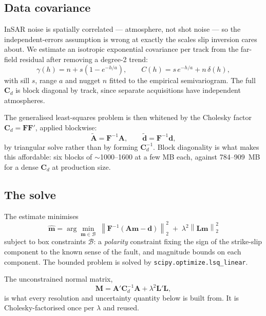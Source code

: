 \documentclass[11pt,a4paper]{article}
\newcommand{\A}{\mathbf{A}}
\newcommand{\Cd}{\mathbf{C}_d}
\newcommand{\Lop}{\mathbf{L}}
\newcommand{\M}{\mathbf{M}}
\newcommand{\bfm}{\bm{m}}
\newcommand{\bfd}{\bm{d}}
\begin{document}
\subsection{Data covariance}

InSAR noise is spatially correlated --- atmosphere, not shot noise --- so the
independent-errors assumption is wrong at exactly the scales slip inversion cares
about. We estimate an isotropic exponential covariance per track from the
far-field residual after removing a degree-2 trend:
\begin{equation}
\gamma(h) = n + s\left(1 - e^{-h/a}\right),
\qquad
C(h) = s\,e^{-h/a} + n\,\delta(h),
\label{eq:variogram}
\end{equation}
with sill $s$, range $a$ and nugget $n$ fitted to the empirical semivariogram.
The full $\Cd$ is block diagonal by track, since separate acquisitions have
independent atmospheres.

The generalised least-squares problem is then whitened by the Cholesky factor
$\Cd = \bm{F}\bm{F}'$, applied blockwise:
\begin{equation}
\tilde{\A} = \bm{F}^{-1}\A, \qquad \tilde{\bfd} = \bm{F}^{-1}\bfd ,
\end{equation}
by triangular solve rather than by forming $\Cd^{-1}$. Block diagonality is what
makes this affordable: six blocks of $\sim$1000--1600 at a few MB each, against
784--909~MB for a dense $\Cd$ at production size.

\subsection{The solve}

The estimate minimises
\begin{equation}
\boxed{\;
\hat{\bfm} = \arg\min_{\bfm \in \mathcal{B}}
\;\left\|\bm{F}^{-1}\left(\A\bfm - \bfd\right)\right\|_2^2
\;+\; \lambda^2 \left\|\Lop\bfm\right\|_2^2 \; }
\label{eq:objective}
\end{equation}
subject to box constraints $\mathcal{B}$: a \emph{polarity} constraint fixing the
sign of the strike-slip component to the known sense of the fault, and magnitude
bounds on each component. The bounded problem is solved by
\texttt{scipy.optimize.lsq\_linear}.

The unconstrained normal matrix,
\begin{equation}
\M = \A'\Cd^{-1}\A + \lambda^2\Lop'\Lop ,
\label{eq:normal}
\end{equation}
is what every resolution and uncertainty quantity below is built from. It is
Cholesky-factorised once per $\lambda$ and reused.
\end{document}
